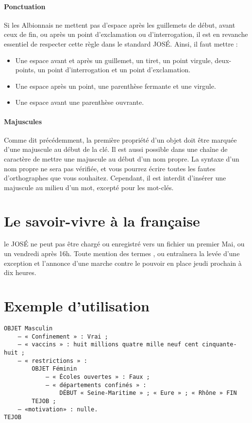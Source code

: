 \documentclass[french]{article}
\begin{document}
{    \paragraph{Ponctuation} {
        Si les Albionnais ne mettent pas d'espace après les guillemets de début, avant ceux de fin, ou après un point d'exclamation ou d'interrogation, il est en revanche essentiel de respecter cette règle dans le standard JOSÉ. Ainsi, il faut mettre :
        \begin{itemize}
            \item Une espace avant et après un guillemet, un tiret, un point virgule, deux-points, un point d'interrogation et un point d'exclamation.
            \item Une espace après un point, une parenthèse fermante et une virgule.
            \item Une espace avant une parenthèse ouvrante.
        \end{itemize}
    }
    \paragraph{Majuscules} {
        Comme dit précédemment, la première propriété d'un objet doit être marquée d'une majuscule au début de la clé. Il est aussi possible dans une chaîne de caractère de mettre une majuscule au début d'un nom propre. La syntaxe d'un nom propre ne sera pas vérifiée, et vous pourrez écrire toutes les fautes d'orthographes que vous souhaitez. Cependant, il est interdit d'insérer une majuscule au milieu d'un mot, excepté pour les mot-clés.
    }
}

\section{Le savoir-vivre à la française} {
    le JOSÉ ne peut pas être chargé ou enregistré vers un fichier un premier Mai, ou un vendredi après 16h. Toute mention des termes ,  ou  entraînera la levée d'une exception et l'annonce d'une marche contre le pouvoir en place jeudi prochain à dix heures.
}

\section{Exemple d'utilisation} {
\begin{verbatim}
OBJET Masculin
    — « Confinement » : Vrai ;
    — « vaccins » : huit millions quatre mille neuf cent cinquante-huit ;
    — « restrictions » :
        OBJET Féminin
            — « Écoles ouvertes » : Faux ;
            — « départements confinés » : 
                DÉBUT « Seine-Maritime » ; « Eure » ; « Rhône » FIN
        TEJOB ;
    — «motivation» : nulle.
TEJOB
\end{verbatim}
}
\end{document}
